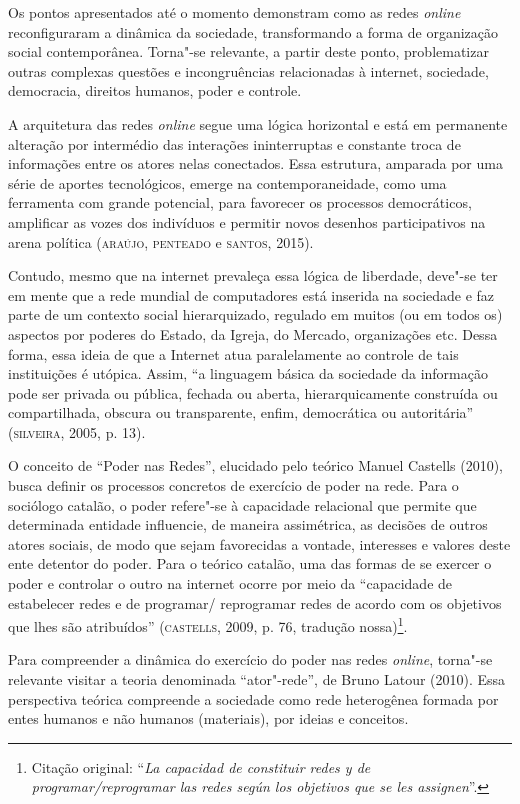 Os pontos apresentados até o momento demonstram como as redes \emph{online}
reconfiguraram a dinâmica da sociedade, transformando a forma de
organização social contemporânea. Torna"-se relevante, a partir deste
ponto, problematizar outras complexas questões e incongruências
relacionadas à internet, sociedade, democracia, direitos humanos, poder
e controle.

A arquitetura das redes \emph{online} segue uma lógica horizontal e está em
permanente alteração por intermédio das interações ininterruptas e
constante troca de informações entre os atores nelas conectados. Essa
estrutura, amparada por uma série de aportes tecnológicos, emerge na
contemporaneidade, como uma ferramenta com grande potencial, para
favorecer os processos democráticos, amplificar as vozes dos indivíduos
e permitir novos desenhos participativos na arena política (\textsc{araújo},
\textsc{penteado} e \textsc{santos}, 2015).

Contudo, mesmo que na internet prevaleça essa lógica de liberdade,
deve"-se ter em mente que a rede mundial de computadores está inserida na
sociedade e faz parte de um contexto social hierarquizado, regulado em
muitos (ou em todos os) aspectos por poderes do Estado, da Igreja, do
Mercado, organizações etc. Dessa forma, essa ideia de que a Internet
atua paralelamente ao controle de tais instituições é utópica. Assim,
``a linguagem básica da sociedade da informação pode ser privada ou
pública, fechada ou aberta, hierarquicamente construída ou
compartilhada, obscura ou transparente, enfim, democrática ou
autoritária'' (\textsc{silveira}, 2005, p. 13).

O conceito de ``Poder nas Redes'', elucidado pelo teórico Manuel
Castells (2010), busca definir os processos concretos de exercício de
poder na rede. Para o sociólogo catalão, o poder refere"-se à capacidade
relacional que permite que determinada entidade influencie, de maneira
assimétrica, as decisões de outros atores sociais, de modo que sejam
favorecidas a vontade, interesses e valores deste ente detentor do
poder. Para o teórico catalão, uma das formas de se exercer o poder e
controlar o outro na internet ocorre por meio da ``capacidade de
estabelecer redes e de programar/ reprogramar redes de acordo com os
objetivos que lhes são atribuídos'' (\textsc{castells}, 2009, p. 76, tradução nossa)\footnote{Citação original: ``\emph{La capacidad de constituir redes y de
  programar/reprogramar las redes según los objetivos que se les
  assignen}''.}.

Para compreender a dinâmica do exercício do poder nas redes \emph{online},
torna"-se relevante visitar a teoria denominada ``ator"-rede'', de Bruno
Latour (2010). Essa perspectiva teórica compreende a sociedade como rede
heterogênea formada por entes humanos e não humanos (materiais), por
ideias e conceitos.


